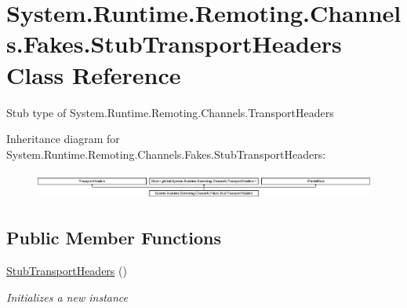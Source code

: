 \hypertarget{class_system_1_1_runtime_1_1_remoting_1_1_channels_1_1_fakes_1_1_stub_transport_headers}{\section{System.\-Runtime.\-Remoting.\-Channels.\-Fakes.\-Stub\-Transport\-Headers Class Reference}
\label{class_system_1_1_runtime_1_1_remoting_1_1_channels_1_1_fakes_1_1_stub_transport_headers}
}


Stub type of System.\-Runtime.\-Remoting.\-Channels.\-Transport\-Headers 


Inheritance diagram for System.\-Runtime.\-Remoting.\-Channels.\-Fakes.\-Stub\-Transport\-Headers\-:\begin{figure}[H]
\begin{center}
\leavevmode
\includegraphics[height=0.897436cm]{class_system_1_1_runtime_1_1_remoting_1_1_channels_1_1_fakes_1_1_stub_transport_headers}
\end{center}
\end{figure}
\subsection*{Public Member Functions}
\begin{DoxyCompactItemize}
\item 
\hyperlink{class_system_1_1_runtime_1_1_remoting_1_1_channels_1_1_fakes_1_1_stub_transport_headers_aab704dde8886b71dd468bdfedfa17353}{Stub\-Transport\-Headers} ()
\begin{DoxyCompactList}\small\item\em Initializes a new instance\end{DoxyCompactList}\end{DoxyCompactItemize}

